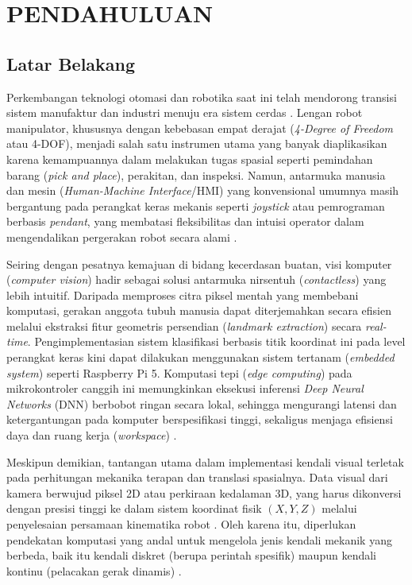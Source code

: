 \chapter{PENDAHULUAN}

\section{Latar Belakang}
Perkembangan teknologi otomasi dan robotika saat ini telah mendorong transisi sistem manufaktur dan industri menuju era sistem cerdas \cite{craig2018}. Lengan robot manipulator, khususnya dengan kebebasan empat derajat (\textit{4-Degree of Freedom} atau 4-DOF), menjadi salah satu instrumen utama yang banyak diaplikasikan karena kemampuannya dalam melakukan tugas spasial seperti pemindahan barang (\textit{pick and place}), perakitan, dan inspeksi. Namun, antarmuka manusia dan mesin (\textit{Human-Machine Interface}/HMI) yang konvensional umumnya masih bergantung pada perangkat keras mekanis seperti \textit{joystick} atau pemrograman berbasis \textit{pendant}, yang membatasi fleksibilitas dan intuisi operator dalam mengendalikan pergerakan robot secara alami \cite{rautaray2015}.

Seiring dengan pesatnya kemajuan di bidang kecerdasan buatan, visi komputer (\textit{computer vision}) hadir sebagai solusi antarmuka nirsentuh (\textit{contactless}) yang lebih intuitif. Daripada memproses citra piksel mentah yang membebani komputasi, gerakan anggota tubuh manusia dapat diterjemahkan secara efisien melalui ekstraksi fitur geometris persendian (\textit{landmark extraction}) secara \textit{real-time}. Pengimplementasian sistem klasifikasi berbasis titik koordinat ini pada level perangkat keras kini dapat dilakukan menggunakan sistem tertanam (\textit{embedded system}) seperti Raspberry Pi 5. Komputasi tepi (\textit{edge computing}) pada mikrokontroler canggih ini memungkinkan eksekusi inferensi \textit{Deep Neural Networks} (DNN) berbobot ringan secara lokal, sehingga mengurangi latensi dan ketergantungan pada komputer berspesifikasi tinggi, sekaligus menjaga efisiensi daya dan ruang kerja (\textit{workspace}) \cite{shi2016}.

Meskipun demikian, tantangan utama dalam implementasi kendali visual terletak pada perhitungan mekanika terapan dan translasi spasialnya. Data visual dari kamera berwujud piksel 2D atau perkiraan kedalaman 3D, yang harus dikonversi dengan presisi tinggi ke dalam sistem koordinat fisik $(X,Y,Z)$ melalui penyelesaian persamaan kinematika robot \cite{craig2018}. Oleh karena itu, diperlukan pendekatan komputasi yang andal untuk mengelola jenis kendali mekanik yang berbeda, baik itu kendali diskret (berupa perintah spesifik) maupun kendali kontinu (pelacakan gerak dinamis) \cite{lugaresi2019}.

